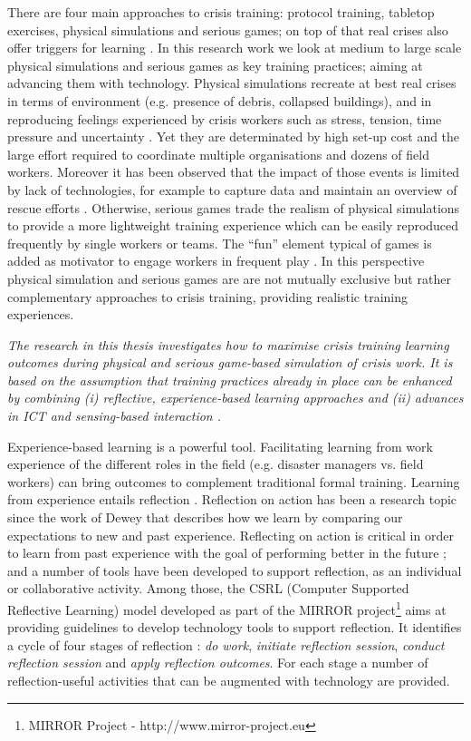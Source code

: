 There are four main approaches to crisis training: protocol training, tabletop exercises, physical simulations and serious games; on top of that real crises also offer triggers for learning \autocite{Deverell:2009fk}. In this research work we look at medium to large scale physical simulations and serious games as key training practices; aiming at advancing them with technology. Physical simulations recreate at best real crises in terms of environment (e.g. presence of debris, collapsed buildings), and in reproducing feelings experienced by crisis workers such as stress, tension, time pressure and uncertainty \autocite{Borodzicz:2002em}. Yet they are determinated by high set-up cost and the large effort required to coordinate multiple organisations and dozens of field workers. Moreover it has been observed that the impact of those events is limited by lack of technologies, for example to capture data and maintain an overview of rescue efforts \autocite{Kyng:2006he}. Otherwise, serious games trade the realism of physical simulations to provide a more lightweight training experience which can be easily reproduced frequently by single workers or teams. The ``fun'' element typical of games is added as motivator to engage workers in frequent play \autocite{DiLoreto:2012jj}. In this perspective physical simulation and serious games are are not mutually exclusive but rather complementary approaches to crisis training, providing realistic training experiences.

\emph{The research in this thesis investigates how to maximise crisis training learning outcomes during physical and serious game-based simulation of crisis work. It is based on the assumption that training practices already in place can be enhanced by combining (i) reflective, experience-based learning approaches and (ii) advances in ICT and sensing-based interaction \autocite{Zhai:2005jm}.}

Experience-based learning is a powerful tool. Facilitating learning from work experience of the different roles in the field (e.g. disaster managers vs. field workers) can bring outcomes to complement traditional formal training. Learning from experience entails reflection \autocites{boud1985reflection}{Dewey:1998ug}{kolb1974toward}. Reflection on action has been a research topic since the work of Dewey \autocite{dewey1933we} that describes how we learn by comparing our expectations to new and past experience. Reflecting on action is critical in order to learn from past experience with the goal of performing better in the future \autocites{boud1985reflection}{Schon:1983ut}; and a number of tools have been developed to support reflection, as an individual or collaborative activity. Among those, the CSRL (Computer Supported Reflective Learning) model developed as part of the MIRROR project\footnote{MIRROR Project - http://www.mirror-project.eu} aims at providing guidelines to develop technology tools to support reflection. It identifies a cycle of four stages of reflection \autocite{Krogstie:2013kf}: \emph{do work}, \emph{initiate reflection session}, \emph{conduct reflection session} and \emph{apply reflection outcomes}. For each stage a number of reflection-useful activities that can be augmented with technology are provided.


